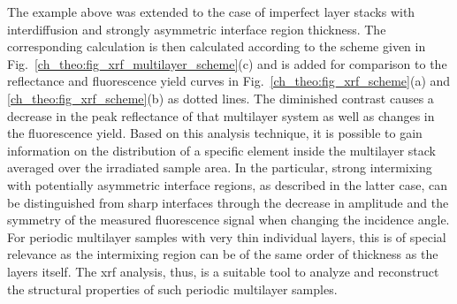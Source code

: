 The example above was extended to the case of imperfect layer stacks with interdiffusion and strongly asymmetric interface region thickness. The corresponding calculation is then calculated according to the scheme given in Fig.~\ref{ch_theo:fig_xrf_multilayer_scheme}(c) and is added for comparison to the reflectance and fluorescence yield curves in Fig.~\ref{ch_theo:fig_xrf_scheme}(a) and \ref{ch_theo:fig_xrf_scheme}(b) as dotted lines. The diminished contrast causes a decrease in the peak reflectance of that multilayer system as well as changes in the fluorescence yield. Based on this analysis technique, it is possible to gain information on the distribution of a specific element inside the multilayer stack averaged over the irradiated sample area. In the particular, strong intermixing with potentially asymmetric interface regions, as described in the latter case, can be distinguished from sharp interfaces through the decrease in amplitude and the symmetry of the measured fluorescence signal when changing the incidence angle. For periodic multilayer samples with very thin individual layers, this is of special relevance as the intermixing region can be of the same order of thickness as the layers itself. The \gls{xrf} analysis, thus, is a suitable tool to analyze and reconstruct the structural properties of such periodic multilayer samples.



